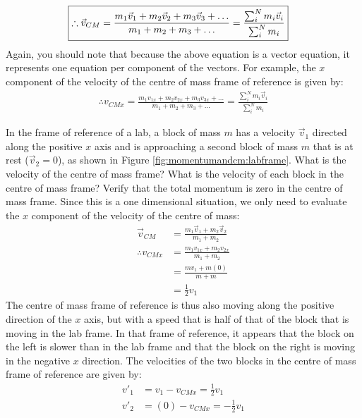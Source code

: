 \begin{align}
\Aboxed{\therefore \vec v_{CM} = \frac{m_1\vec v_1 + m_2\vec v_2 + m_3 \vec v_3 + \dots }{m_1+m_2+m_3+\dots}=\frac{\sum_i^N m_i\vec v_i}{\sum_i^N m_i}}
\end{align}
Again, you should note that because the above equation is a vector equation, it represents one equation per component of the vectors. For example, the $x$ component of the velocity of the centre of mass frame of reference is given by:
\begin{align*}
\therefore  v_{CMx} = \frac{m_1 v_{1x} + m_2v_{2x} + m_3 v_{3x} + \dots }{m_1+m_2+m_3+\dots}=\frac{\sum_i^N m_i\vec v_i}{\sum_i^N m_i}
\end{align*}


\begin{example}{ In the frame of reference of a lab, a block of mass $m$ has a velocity $\vec v_1$ directed along the positive $x$ axis and is approaching a second block of mass $m$ that is at rest ($\vec v_2=0$), as shown in Figure \ref{fig:momentumandcm:labframe}. What is the velocity of the centre of mass frame? What is the velocity of each block in the centre of mass frame? Verify that the total momentum is zero in the centre of mass frame.}
Since this is a one dimensional situation, we only need to evaluate the $x$ component of the velocity of the centre of mass:
\begin{align*}
\vec v_{CM} &= \frac{m_1\vec v_1 + m_2\vec v_2 }{m_1+m_2}\\
\therefore v_{CMx} &= \frac{m_1 v_{1x} + m_2 v_{2x}}{m_1+m_2}\\
&=\frac{mv_1 + m(0) }{m+m}\\
&=\frac{1}{2}v_1
\end{align*}
The centre of mass frame of reference is thus also moving along the positive direction of the $x$ axis, but with a speed that is half of that of the block that is moving in the lab frame. In that frame of reference, it appears that the block on the left is slower than in the lab frame and that the block on the right is moving in the negative $x$ direction. The velocities of the two blocks in the centre of mass frame of reference are given by:
\begin{align*}
v'_1&=v_1-v_{CMx}=\frac{1}{2}v_1\\
v'_2&=(0)-v_{CMx}=-\frac{1}{2}v_1
\end{align*}

\end{example}

